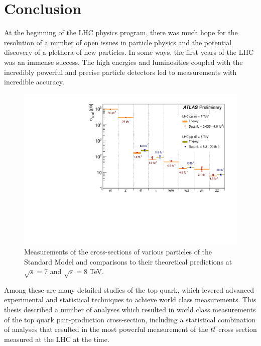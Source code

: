 

\chapter{Conclusion}

At the beginning of the LHC physics program, there was much hope for the
resolution of a number of open issues in particle physics and the potential
discovery of a plethora of new particles.
In some ways, the first years of the LHC was an immense success.
The high energies and luminosities coupled with the incredibly powerful
and precise particle detectors led to measurements with incredible
accuracy.

\begin{figure}[ht!]
  \begin{center}
    \includegraphics[width=.75\textwidth]{figures/conclusion/SM_SummaryPlotMoriondEWK2013}
    \caption{Measurements of the cross-sections of various particles of the Standard Model and comparisons to their theoretical predictions at $\sqrt{s}=7$ and $\sqrt{s} = 8$ TeV.}
    \label{fig:xsec_vs_roots}
  \end{center}
\end{figure}


Among these are many detailed studies of the top quark, which levered
advanced experimental and statistical techniques to achieve world class measurements.
This thesis described a number of analyses which resulted in world class measurements
of the top quark pair-production cross-section, including a statistical combination
of analyses that resulted in the most powerful measurement of the $t\bar{t}$ cross
section measured at the LHC at the time.

